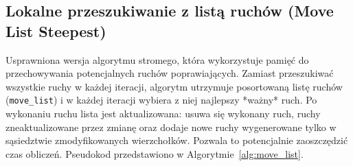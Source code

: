 \documentclass[12pt,a4paper]{article}
\begin{document}
\subsection{Lokalne przeszukiwanie z listą ruchów (Move List Steepest)}
Usprawniona wersja algorytmu stromego, która wykorzystuje pamięć do przechowywania potencjalnych ruchów poprawiających. Zamiast przeszukiwać wszystkie ruchy w każdej iteracji, algorytm utrzymuje posortowaną listę ruchów (\texttt{move\_list}) i w każdej iteracji wybiera z niej najlepszy *ważny* ruch. Po wykonaniu ruchu lista jest aktualizowana: usuwa się wykonany ruch, ruchy zneaktualizowane przez zmianę oraz dodaje nowe ruchy wygenerowane tylko w sąsiedztwie zmodyfikowanych wierzchołków. Pozwala to potencjalnie zaoszczędzić czas obliczeń. Pseudokod przedstawiono w Algorytmie~\ref{alg:move_list}.
\end{document}
